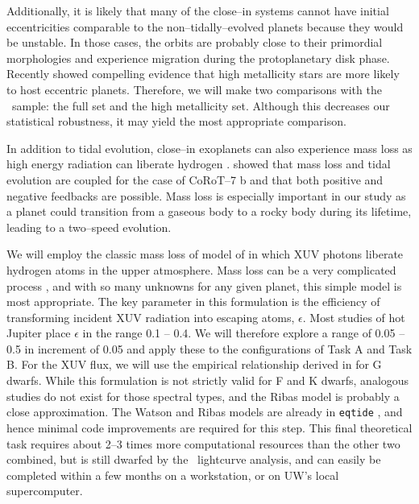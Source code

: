 Additionally, it is likely that many of the close--in systems cannot
have initial eccentricities comparable to the non--tidally--evolved
planets because they would be unstable.  In those cases, the orbits
are probably close to their primordial morphologies and experience
migration during the protoplanetary disk phase.  Recently
\cite{DawsonMurrayClay13} showed compelling evidence that high
metallicity stars are more likely to host eccentric planets.
Therefore, we will make two comparisons with the \kepler~sample: the
full set and the high metallicity set.  Although this decreases our
statistical robustness, it may yield the most appropriate comparison.

\medskip
{\centerline{}}
\smallskip

In addition to tidal evolution, close--in exoplanets can also
experience mass loss as high energy radiation can liberate hydrogen
\citep{Watson81,VidalMadjar04}.  \cite{Jackson10} showed that mass
loss and tidal evolution are coupled for the case of CoRoT--7 b and
that both positive and negative feedbacks are possible.  Mass loss is
especially important in our study as a planet could transition from a
gaseous body to a rocky body during its lifetime, leading to a
two--speed evolution.

We will employ the classic mass loss of model of \cite{Watson81} in
which XUV photons liberate hydrogen atoms in the upper atmosphere.
Mass loss can be a very complicated process
\citep{Yelle04,Lammer07,Khodachenko07,Lammer10,Leitzinger11}, and with
so many unknowns for any given planet, this simple model is most
appropriate.  The key parameter in this formulation is the efficiency
of transforming incident XUV radiation into escaping atoms,
$\epsilon$.  Most studies of hot Jupiter place $\epsilon$ in the range
0.1 -- 0.4.  We will therefore explore a range of 0.05 -- 0.5 in
increment of 0.05 and apply these to the configurations of Task A and
Task B.  For the XUV flux, we will use the empirical relationship
derived in \cite{Ribas05} for G dwarfs.  While this formulation is not
strictly valid for F and K dwarfs, analogous studies do not exist for
those spectral types, and the Ribas model is probably a close
approximation.  The Watson and Ribas models are already in
\texttt{eqtide} \citep{Barnes12}, and hence minimal code improvements
are required for this step.  This final theoretical task requires
about 2--3 times more computational resources than the other two
combined, but is still dwarfed by the \kepler~lightcurve analysis, and
can easily be completed within a few months on a workstation, or on
UW's local supercomputer.

